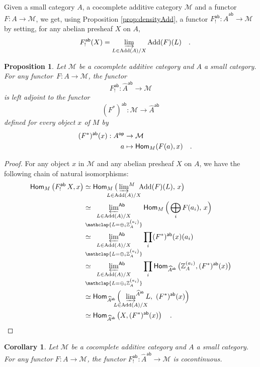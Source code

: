 \documentclass[10pt, english, a4paper, nothms]{amsart}
\theoremstyle{plain}
\newtheorem{prop}[theorem]{Proposition}
\newtheorem{coro}[theorem]{Corollary}
\theoremstyle{remark}
\theoremstyle{definition}
\numberwithin{equation}{theorem}
\newcommand\Z{\mathbb{Z}}
\let\limind\varinjlim
\let\limproj\varprojlim
\newcommand{\Hom}{\operatorname{\mathsf{Hom}}}
\DeclareMathOperator{\op}{\mathsf{op}}
\newcommand{\tranche}[2]{#1/{#2}}
\newcommand{\M}{\mathcal{M}}
\newcommand{\Ab}{{\mathsf{Ab}}}
\newcommand{\ab}{{\mathsf{ab}}}
\DeclareMathOperator{\Add}{\mathrm{Add}}
\newcommand{\Wh}[2]{\Z_{#1}^{\left(#2\right)}}
\newcommand{\prefab}[1]{\widehat{ #1 }^{\mathsf{ab}}}
\newcommand\zbox[1]{\makebox[0pt][l]{#1}}
\newcommand\pbox[1]{\zbox{\quad #1}} %
\begin{document}
\paragr Given a small category $A$, a cocomplete additive category $\M$ and a
functor~$F: A \to \M$, we get, using Proposition \ref{prop:densityAdd}, a
functor $F_!^\ab: \prefab{A}\to\M$ by setting, for any abelian presheaf $X$ on
$A$,
\[
F_!^\ab(X) = \limind_{L \in \tranche{\Add(A)}{X}} \Add(F)(L) \pbox{.}
\]

\begin{prop}\label{prop:leftKanExtAb}
Let $\M$ be a cocomplete additive category and $A$ a small category. For any
functor~$F: A \to \M$, the functor 
\[
F_!^\ab: \prefab{A}\to\M 
\]
is left adjoint to the functor 
\[
(F^*)^\ab: \M\to\prefab{A} 
\]
defined for every object $x$ of $M$ by 
\begin{align*}
(F^*)^\ab(x): {A}^{\op} &\to \M \\
a &\mapsto \Hom_M(F(a),x) \pbox{.}
\end{align*}
\end{prop}
\begin{proof}
For any object $x$ in $\M$ and any abelian presheaf $X$ on $A$, we
have the following chain of natural isomorphisms:
\begin{align*}
\Hom_M\left(F_!^\ab\,X, x \right)
  & \simeq \Hom_M\big(\!\!\!\!\!
      \sideset{}{^M}\limind_{L \in \tranche{\Add(A)}{X}} \!\!\!\Add(F)(L),\, x
      \big)
  \\ & \simeq \!\!\sideset{}{^\Ab}\limproj_{\substack{L \in \tranche{\Add(A)}{X} \\
    \mathclap{L = \oplus_i\Wh{A}{a_i}}}} 
\Hom_M\Big(\bigoplus_i F(a_i),\, x\Big)
  \\ & \simeq \!\!\sideset{}{^\Ab}\limproj_{\substack{L \in \Add(A)/X\\ 
    \mathclap{L = \oplus_i\Wh{A}{a_i}}}} \prod_i (F^*)^\ab(x)(a_i)
  \\ & \simeq \!\!\sideset{}{^\Ab}\limproj_{\substack{L \in \tranche{\Add(A)}{X} \\ 
    \mathclap{L = \oplus_{i}\Wh{A}{a_i}}}} \prod_i
\Hom_{\prefab{A}}\big(\Wh{A}{a_i}, (F^*)^\ab(x)\big)
  \\ & \simeq \Hom_{\prefab{A}}\Big(\sideset{}{^{\prefab{A}}}\limind_{L \in
      \Add(A)/X}\!\!\!L,\,\,
      (F^*)^\ab(x)\Big)
  \\ & \simeq \Hom_{\prefab{A}} \left(X, (F^*)^\ab(x)\right) \pbox{.}
  \qedhere
\end{align*}
\end{proof}

\begin{coro}\label{coro:F_!cocontinu}
Let $\M$ be a cocomplete additive category and $A$ a small category.
For any functor $F: A \to
\M$, the functor $F_!^\ab: \prefab{A}\to\M$ is cocontinuous.
\end{coro}
\end{document}

